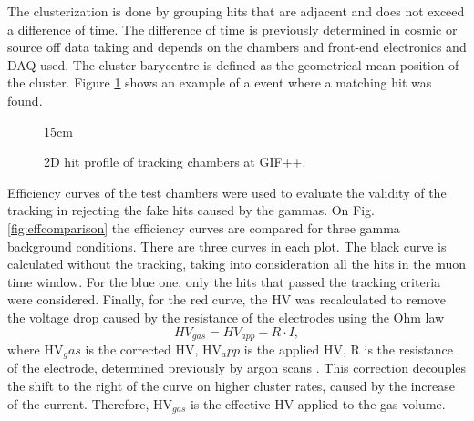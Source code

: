 The clusterization is done by grouping hits that are adjacent and does not exceed a difference of time. The difference of time is previously determined in cosmic or source off data taking and depends on the chambers and front-end electronics and DAQ used. The cluster barycentre is defined as the geometrical mean position of the cluster. Figure \ref{fig:tracking_evt} shows an example of a event where a matching hit was found.

\begin{figure}[!htm]{15cm} %
\caption{2D hit profile of tracking chambers at GIF++.}%
\label{fig:tracking_evt}
\end{figure}

Efficiency curves of the test chambers were used to evaluate the validity of the tracking in rejecting the fake hits caused by the gammas. On Fig. \ref{fig:effcomparison} the efficiency curves are compared for three gamma background conditions. There are three curves in each plot. The black curve is calculated without the tracking, taking into consideration all the hits in the muon time window. For the blue one, only the hits that passed the tracking criteria were considered. Finally, for the red curve, the HV was recalculated to remove the voltage drop caused by the resistance of the electrodes using the Ohm law
\begin{equation}
    HV_{gas} = HV_{app} - R \cdot I,
\end{equation}
where HV$_gas$ is the corrected HV, HV$_app$ is the applied HV, R is the resistance of the electrode, determined previously by argon scans \cite{peskov2018resistive}. This correction decouples the shift to the right of the curve on higher cluster rates, caused by the increase of the current. Therefore, HV$_{gas}$ is the effective HV applied to the gas volume. 

